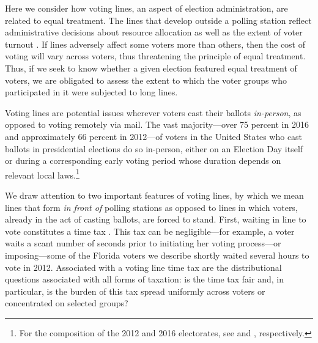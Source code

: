 \documentclass[12pt,titlepage]{article}
\begin{document}


Here we consider how voting lines, an aspect of election
administration, are related to equal treatment.  The lines that
develop outside a polling station reflect administrative decisions
about resource allocation as well as the extent of voter turnout
\citep{herronsmith:hanoverstudy}.  If lines adversely affect some
voters more than others, then the cost of voting will vary across
voters, thus threatening the principle of equal treatment.  Thus, if
we seek to know whether a given election featured equal treatment of
voters, we are obligated to assess the extent to which the voter
groups who participated in it were subjected to long lines.

Voting lines are potential issues wherever voters cast their ballots
\emph{in-person}, as opposed to voting remotely via mail.  The vast
majority---over 75 percent in 2016 and approximately 66 percent in
2012---of voters in the United States who cast ballots in presidential
elections do so in-person, either on an Election Day itself or during
a corresponding early voting period whose duration depends on relevant
local laws.\footnote{For the composition of the 2012 and 2016
  electorates, see \citet{eac:2012} and \citet{eac:2016},
  respectively.}




We draw attention to two important features of voting lines, by which
we mean lines that form \emph{in front of} polling stations as opposed
to lines in which voters, already in the act of casting ballots, are
forced to stand.  First, waiting in line to vote constitutes a time
tax \citep{mukherjee:timetax}.  This tax can be negligible---for
example, a voter waits a scant number of seconds prior to initiating
her voting process---or imposing---some of the Florida voters we
describe shortly waited several hours to vote in 2012.  Associated
with a voting line time tax are the distributional questions
associated with all forms of taxation: is the time tax fair and, in
particular, is the burden of this tax spread uniformly across voters
or concentrated on selected groups?
\end{document}
